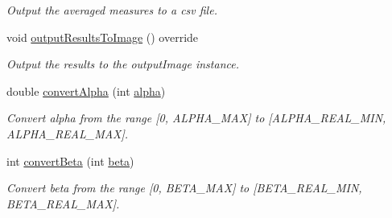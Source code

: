\begin{DoxyCompactItemize}
\begin{DoxyCompactList}\small\item\em Output the averaged measures to a csv file. \end{DoxyCompactList}\item 
void \hyperlink{classmultiscale_1_1analysis_1_1RegionDetector_a23a3ada51983d2a3041f403323e27d06}{output\-Results\-To\-Image} () override
\begin{DoxyCompactList}\small\item\em Output the results to the output\-Image instance. \end{DoxyCompactList}\item 
double \hyperlink{classmultiscale_1_1analysis_1_1RegionDetector_a3de7a4d365c182917b74117a22075ec4}{convert\-Alpha} (int \hyperlink{classmultiscale_1_1analysis_1_1RegionDetector_ab768a3bbfff9835b441a889ab2cb05a6}{alpha})
\begin{DoxyCompactList}\small\item\em Convert alpha from the range \mbox{[}0, A\-L\-P\-H\-A\-\_\-\-M\-A\-X\mbox{]} to \mbox{[}A\-L\-P\-H\-A\-\_\-\-R\-E\-A\-L\-\_\-\-M\-I\-N, A\-L\-P\-H\-A\-\_\-\-R\-E\-A\-L\-\_\-\-M\-A\-X\mbox{]}. \end{DoxyCompactList}\item 
int \hyperlink{classmultiscale_1_1analysis_1_1RegionDetector_a60083ca10a42c25d67e371506cbf5620}{convert\-Beta} (int \hyperlink{classmultiscale_1_1analysis_1_1RegionDetector_a23c831170c2264dd7e59067a1a7d3c8e}{beta})
\begin{DoxyCompactList}\small\item\em Convert beta from the range \mbox{[}0, B\-E\-T\-A\-\_\-\-M\-A\-X\mbox{]} to \mbox{[}B\-E\-T\-A\-\_\-\-R\-E\-A\-L\-\_\-\-M\-I\-N, B\-E\-T\-A\-\_\-\-R\-E\-A\-L\-\_\-\-M\-A\-X\mbox{]}. \end{DoxyCompactList}\end{DoxyCompactItemize}

